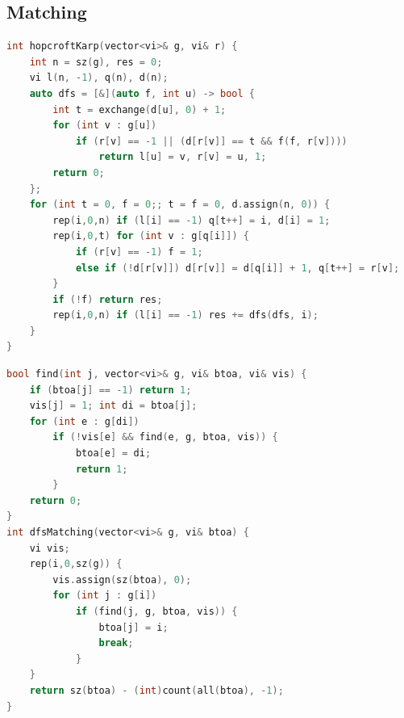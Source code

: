 \begin{multicols}{\Columns}
\subsection{Matching}
\begin{lstlisting}[language=C++]
int hopcroftKarp(vector<vi>& g, vi& r) {
	int n = sz(g), res = 0;
	vi l(n, -1), q(n), d(n);
	auto dfs = [&](auto f, int u) -> bool {
		int t = exchange(d[u], 0) + 1;
		for (int v : g[u])
			if (r[v] == -1 || (d[r[v]] == t && f(f, r[v])))
				return l[u] = v, r[v] = u, 1;
		return 0;
	};
	for (int t = 0, f = 0;; t = f = 0, d.assign(n, 0)) {
		rep(i,0,n) if (l[i] == -1) q[t++] = i, d[i] = 1;
		rep(i,0,t) for (int v : g[q[i]]) {
			if (r[v] == -1) f = 1;
			else if (!d[r[v]]) d[r[v]] = d[q[i]] + 1, q[t++] = r[v];
		}
		if (!f) return res;
		rep(i,0,n) if (l[i] == -1) res += dfs(dfs, i);
	}
}
\end{lstlisting}

\begin{lstlisting}[language=C++]
bool find(int j, vector<vi>& g, vi& btoa, vi& vis) {
	if (btoa[j] == -1) return 1;
	vis[j] = 1; int di = btoa[j];
	for (int e : g[di])
		if (!vis[e] && find(e, g, btoa, vis)) {
			btoa[e] = di;
			return 1;
		}
	return 0;
}
int dfsMatching(vector<vi>& g, vi& btoa) {
	vi vis;
	rep(i,0,sz(g)) {
		vis.assign(sz(btoa), 0);
		for (int j : g[i])
			if (find(j, g, btoa, vis)) {
				btoa[j] = i;
				break;
			}
	}
	return sz(btoa) - (int)count(all(btoa), -1);
}
\end{lstlisting}


\end{multicols}
